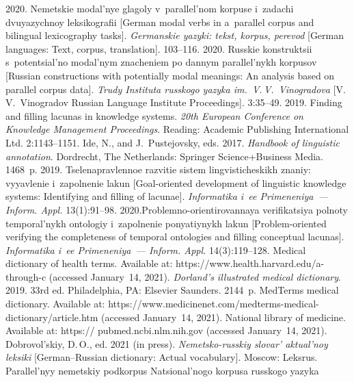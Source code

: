 \begin{multicols}{2}
{{\begin{thebibliography}{99}
 2020. Nemetskie modal'nye glagoly 
v~parallel'nom korpuse i~zadachi dvuyazychnoy leksikografii 
[German modal verbs in a~parallel corpus and bilingual 
lexicography tasks]. \textit{Germanskie yazyki: tekst, korpus, perevod} [German languages: 
Text, corpus, translation]. 103--116.
 2020. Russkie konstruktsii s~potentsial'no 
modal'nym znacheniem po dannym parallel'nykh korpusov [Russian constructions with 
potentially modal meanings: An analysis based on parallel corpus data]. \textit{Trudy Instituta 
russkogo yazyka im.\ V.\,V.~Vinogradova} [V.\,V.~Vinogradov Russian Language Institute 
Proceedings]. 3:35--49.
 2019. Finding and filling lacunas in knowledge systems. \textit{20th 
European Conference on Knowledge Management Proceedings}. Reading: Academic Publishing 
International Ltd. 2:1143--1151.
Ide, N., and J.~Pustejovsky, eds. 2017. \textit{Handbook of linguistic annotation}. Dordrecht, 
The Netherlands: Springer Science\;+\;Business Media. 1468~p.
 2019. Tselenapravlennoe razvitie sistem lingvisticheskikh znaniy: 
vyyavlenie i~zapolnenie lakun [Goal-oriented development of linguistic knowledge systems: 
Identifying and filling of lacunae]. \textit{Informatika i~ee Primeneniya~--- Inform. Appl.} 
13(1):91--98.
 2020.Problemno-orientirovannaya ve\-ri\-fi\-ka\-tsiya polnoty temporal'nykh 
ontologiy i~zapolnenie po\-nya\-tiy\-nykh lakun [Problem-oriented verifying the completeness of 
temporal ontologies and filling conceptual lacunas]. \textit{Informatika i~ee Primeneniya~--- 
Inform. Appl.} 14(3):119--128.
Medical dictionary of health terms. Available at: {\sf 
 https://www.health.harvard.edu/a-through-c} (accessed January~14, 2021).
 \textit{Dorland's illustrated medical dictionary}.  2019. 33rd ed. Philadelphia, PA: Elsevier 
Saunders. 2144~p.
MedTerms medical dictionary. Available at: {\sf  
https://\linebreak www.medicinenet.com/medterms-medical-dictionary/article.htm} (accessed January~14, 
2021).
National library of medicine. Available at: {\sf https:// pubmed.ncbi.nlm.nih.gov} (accessed 
January~14, 2021).
Dobrovol'skiy, D.\,O., ed. 2021 (in press). \textit{Nemetsko-russkiy slovar' aktual'noy leksiki} 
[German--Russian dictionary: Actual vocabulary]. Moscow: Leksrus.
Parallel'nyy nemetskiy podkorpus Natsional'nogo    kor\-pu\-sa russkogo yazyka

\end{thebibliography}}}
\end{multicols}
